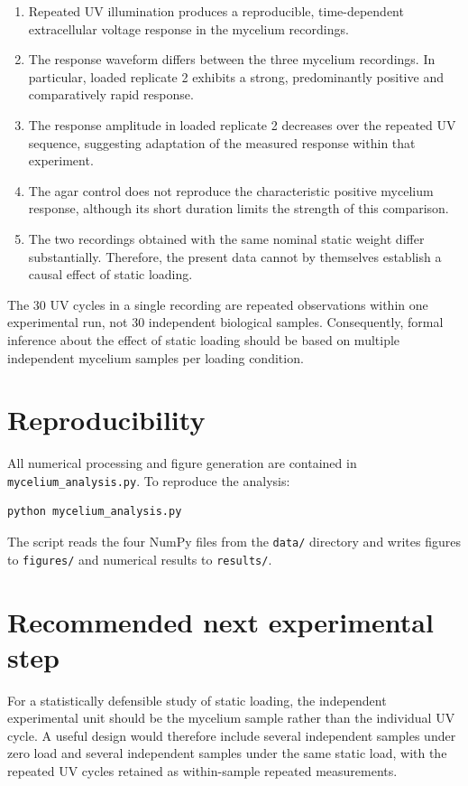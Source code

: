 \documentclass[11pt,a4paper]{article}
\begin{document}
\begin{enumerate}
    \item Repeated UV illumination produces a reproducible,
    time-dependent extracellular voltage response in the mycelium recordings.
    \item The response waveform differs between the three mycelium
    recordings. In particular, loaded replicate 2 exhibits a strong,
    predominantly positive and comparatively rapid response.
    \item The response amplitude in loaded replicate 2 decreases over the
    repeated UV sequence, suggesting adaptation of the measured response
    within that experiment.
    \item The agar control does not reproduce the characteristic positive
    mycelium response, although its short duration limits the strength of
    this comparison.
    \item The two recordings obtained with the same nominal static weight
    differ substantially. Therefore, the present data cannot by themselves
    establish a causal effect of static loading.
\end{enumerate}

The 30 UV cycles in a single recording are repeated observations within one
experimental run, not 30 independent biological samples. Consequently,
formal inference about the effect of static loading should be based on
multiple independent mycelium samples per loading condition.

\section{Reproducibility}

All numerical processing and figure generation are contained in
\texttt{mycelium\_analysis.py}. To reproduce the analysis:

\begin{verbatim}
python mycelium_analysis.py
\end{verbatim}

The script reads the four NumPy files from the \texttt{data/} directory and
writes figures to \texttt{figures/} and numerical results to
\texttt{results/}.

\section{Recommended next experimental step}

For a statistically defensible study of static loading, the independent
experimental unit should be the mycelium sample rather than the individual
UV cycle. A useful design would therefore include several independent
samples under zero load and several independent samples under the same
static load, with the repeated UV cycles retained as within-sample repeated
measurements.
\end{document}
